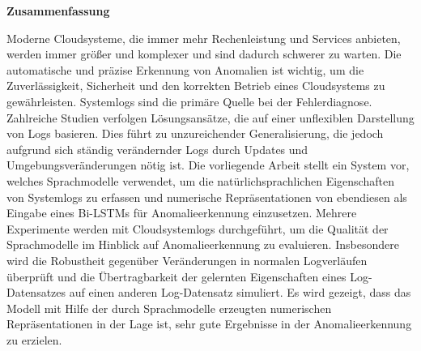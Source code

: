 \thispagestyle{empty}
\vspace*{0.2cm}

\begin{center}
    \textbf{Zusammenfassung}
\end{center}
Moderne Cloudsysteme, die immer mehr Rechenleistung und Services anbieten, werden immer größer und komplexer und sind dadurch schwerer zu warten. Die automatische und präzise Erkennung von Anomalien ist wichtig, um die Zuverlässigkeit, Sicherheit und den korrekten Betrieb eines Cloudsystems zu gewährleisten. Systemlogs sind die primäre Quelle bei der Fehlerdiagnose. Zahlreiche Studien verfolgen Lösungsansätze, die auf einer unflexiblen Darstellung von Logs basieren. Dies führt zu unzureichender Generalisierung, die jedoch aufgrund sich ständig verändernder Logs durch Updates und Umgebungsveränderungen nötig ist. Die vorliegende Arbeit stellt ein System vor, welches Sprachmodelle verwendet, um die natürlichsprachlichen Eigenschaften von Systemlogs zu erfassen und numerische Repräsentationen von ebendiesen als Eingabe eines Bi-LSTMs für Anomalieerkennung einzusetzen. Mehrere Experimente werden mit Cloudsystemlogs durchgeführt, um die Qualität der Sprachmodelle im Hinblick auf Anomalieerkennung zu evaluieren. Insbesondere wird die Robustheit gegenüber Veränderungen in normalen Logverläufen überprüft und die Übertragbarkeit der gelernten Eigenschaften eines Log-Datensatzes auf einen anderen Log-Datensatz simuliert. Es wird gezeigt, dass das Modell mit Hilfe der durch Sprachmodelle erzeugten numerischen Repräsentationen in der Lage ist, sehr gute Ergebnisse in der Anomalieerkennung zu erzielen.
\vspace*{0.2cm}

\noindent 
